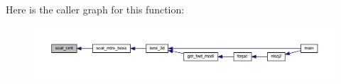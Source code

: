 Here is the caller graph for this function\+:\nopagebreak
\begin{figure}[H]
\begin{center}
\leavevmode
\includegraphics[width=350pt]{Leroi_8f90_aef77ff6f17e654fc7f89a638ad1d2d46_icgraph}
\end{center}
\end{figure}
\mbox{\label{Leroi_8f90_a75fe85be755349539d5b76874d678237}} 
